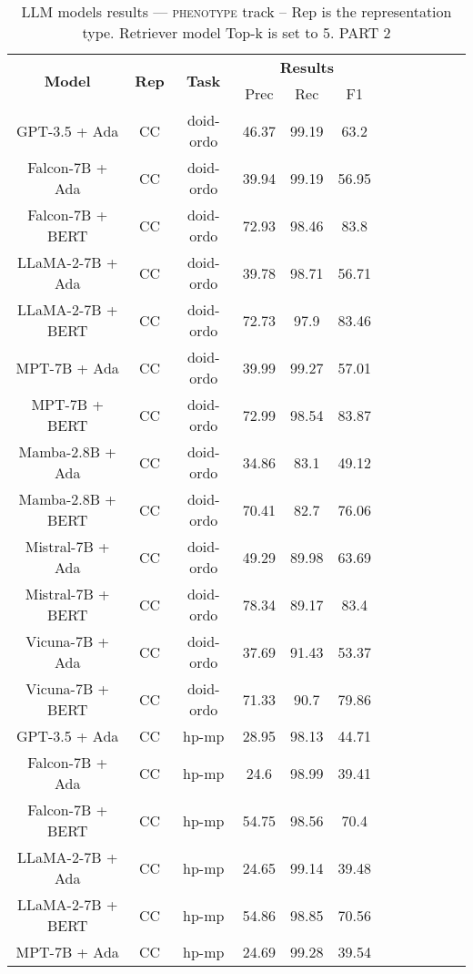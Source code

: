 \begin{table}
        \centering
        \small
        \caption{LLM models results --- \textsc{phenotype} track -- Rep is the representation type. Retriever model Top-k is set to 5. PART 2 } \label{tab:llm_phenotype2}
        \begin{tabular}{|c|c|c|c|c|c|c|c|c|c|c|c|}
            \hline
             \multirow{2}{*}{\textbf{Model}}  & \multirow{2}{*}{\textbf{Rep}}  & \multirow{2}{*}{\textbf{Task}} &  \multicolumn{3}{c|}{\textbf{Results}} \\
             \cline{4-6}
              & & & Prec & Rec & F1  \\
            \hline
	GPT-3.5 + Ada  & CC & doid-ordo  &  46.37 &  99.19 & 63.2  \\
	Falcon-7B + Ada  & CC & doid-ordo  &  39.94 &  99.19 & 56.95  \\
	Falcon-7B + BERT  & CC & doid-ordo  &  72.93 &  98.46 & 83.8  \\
	LLaMA-2-7B + Ada  & CC & doid-ordo  &  39.78 &  98.71 & 56.71  \\
	LLaMA-2-7B + BERT  & CC & doid-ordo  &  72.73 &  97.9 & 83.46  \\
	MPT-7B + Ada  & CC & doid-ordo  &  39.99 &  99.27 & 57.01  \\
	MPT-7B + BERT  & CC & doid-ordo  &  72.99 &  98.54 & 83.87  \\
	Mamba-2.8B + Ada  & CC & doid-ordo  &  34.86 &  83.1 & 49.12  \\
	Mamba-2.8B + BERT  & CC & doid-ordo  &  70.41 &  82.7 & 76.06  \\
	Mistral-7B + Ada  & CC & doid-ordo  &  49.29 &  89.98 & 63.69  \\
	Mistral-7B + BERT  & CC & doid-ordo  &  78.34 &  89.17 & 83.4  \\
	Vicuna-7B + Ada  & CC & doid-ordo  &  37.69 &  91.43 & 53.37  \\
	Vicuna-7B + BERT  & CC & doid-ordo  &  71.33 &  90.7 & 79.86  \\
	\hline
	GPT-3.5 + Ada  & CC & hp-mp  &  28.95 &  98.13 & 44.71  \\
	Falcon-7B + Ada  & CC & hp-mp  &  24.6 &  98.99 & 39.41  \\
	Falcon-7B + BERT  & CC & hp-mp  &  54.75 &  98.56 & 70.4  \\
	LLaMA-2-7B + Ada  & CC & hp-mp  &  24.65 &  99.14 & 39.48  \\
	LLaMA-2-7B + BERT  & CC & hp-mp  &  54.86 &  98.85 & 70.56  \\
	MPT-7B + Ada  & CC & hp-mp  &  24.69 &  99.28 & 39.54  \\

\end{tabular}
\end{table}
